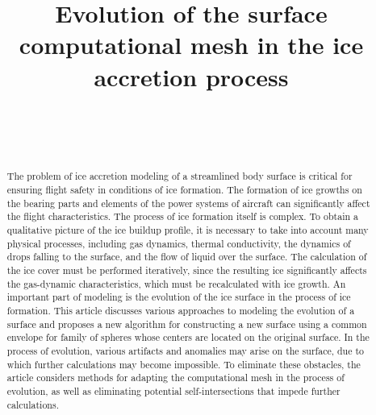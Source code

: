 \documentclass[
11pt,
tightenlines,
twoside,
onecolumn,
nofloats,
nobibnotes,
nofootinbib,
superscriptaddress,
noshowpacs,
centertags]
{revtex4-2}
\begin{document}

\title{Evolution of the surface computational mesh in the ice accretion process}

\author{~}

\author{~}



\begin{abstract}
The problem of ice accretion modeling of a streamlined body surface is critical for ensuring flight safety in conditions of ice formation.
The formation of ice growths on the bearing parts and elements of the power systems of aircraft can significantly affect the flight characteristics.
The process of ice formation itself is complex.
To obtain a qualitative picture of the ice buildup profile, it is necessary to take into account many physical processes, including gas dynamics, thermal conductivity, the dynamics of drops falling to the surface, and the flow of liquid over the surface.
The calculation of the ice cover must be performed iteratively, since the resulting ice significantly affects the gas-dynamic characteristics, which must be recalculated with ice growth.
An important part of modeling is the evolution of the ice surface in the process of ice formation.
This article discusses various approaches to modeling the evolution of a surface and proposes a new algorithm for constructing a new surface using a common envelope for family of spheres whose centers are located on the original surface.
In the process of evolution, various artifacts and anomalies may arise on the surface, due to which further calculations may become impossible.
To eliminate these obstacles, the article considers methods for adapting the computational mesh in the process of evolution, as well as eliminating potential self-intersections that impede further calculations.
\end{abstract}
\end{document}

